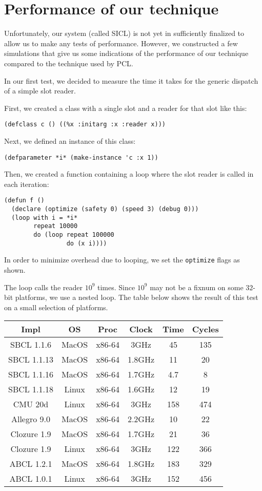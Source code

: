 \section{Performance of our technique}

Unfortunately, our system (called SICL) is not yet in sufficiently
finalized to allow us to make any tests of performance.  However, we
constructed a few simulations that give us some indications of the
performance of our technique compared to the technique used by PCL.

In our first test, we decided to measure the time it takes for the
generic dispatch of a simple slot reader. 

First, we created a class with a single slot and a reader for that
slot like this:

\begin{verbatim}
(defclass c () ((%x :initarg :x :reader x)))  
\end{verbatim}

Next, we defined an instance of this class:

\begin{verbatim}
(defparameter *i* (make-instance 'c :x 1))
\end{verbatim}

Then, we created a function containing a loop where the slot reader is
called in each iteration: 

\begin{verbatim}
(defun f ()
  (declare (optimize (safety 0) (speed 3) (debug 0)))
  (loop with i = *i*
        repeat 10000
        do (loop repeat 100000
                 do (x i))))
\end{verbatim}

In order to minimize overhead due to looping, we set the
\texttt{optimize} flags as shown.

The loop calls the reader $10^9$ times.  Since $10^9$ may not be a
fixnum on some $32$-bit platforms, we use a nested loop.  The table
below shows the result of this test on a small selection of platforms.

{\small\begin{tabular}{|c|c|c|c|c|c|}
\hline
Impl & OS & Proc & Clock & Time & Cycles\\
\hline\hline
SBCL 1.1.6 & MacOS & x86-64 & 3GHz & 45 & 135\\
SBCL 1.1.13 & MacOS & x86-64 & 1.8GHz & 11 & 20 \\
SBCL 1.1.16 & MacOS & x86-64 & 1.7GHz & 4.7 & 8 \\
SBCL 1.1.18 & Linux & x86-64 & 1.6GHz & 12 & 19\\
CMU 20d & Linux & x86-64 & 3GHz & 158 & 474\\
Allegro 9.0 & MacOS & x86-64 & 2.2GHz & 10 & 22\\
Clozure 1.9 & MacOS & x86-64 & 1.7GHz & 21 & 36\\
Clozure 1.9 & Linux & x86-64 & 3GHz & 122 & 366\\
ABCL 1.2.1 & MacOS & x86-64 & 1.8GHz & 183 & 329\\
ABCL 1.0.1 & Linux & x86-64 & 3GHz & 152 & 456\\
\hline
\end{tabular}}

